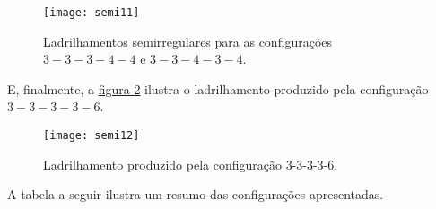 \begin{figure}[H]
\centering
\texttt{[image: semi11]}
\caption{Ladrilhamentos semirregulares para as configurações  $3-3-3-4-4$ e $3-3-4-3-4$.}
\label{semi11}
\end{figure}

 

E, finalmente, a \hyperref[semi12]{figura \ref{semi12}} ilustra o ladrilhamento produzido pela configuração $3-3-3-3-6$.


\begin{figure}[H]
\centering
\texttt{[image: semi12]}
\caption{Ladrilhamento produzido pela configuração 3-3-3-3-6.}
\label{semi12}
\end{figure}


\clearpage
A tabela a seguir ilustra um resumo das configurações apresentadas.


